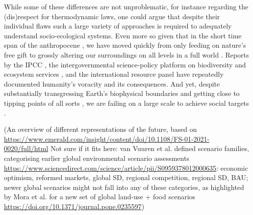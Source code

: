 \documentclass{article}
\begin{document}
\begin{refsection}
While some of these differences are not unproblematic, for instance regarding the (dis)respect for thermodynamic laws, one could argue that despite their individual flaws such a large variety of approaches is required to adequately understand socio-ecological systems. Even more so given that in the short time span of the anthropocene \parencite{crutzen_2006}, we have moved quickly from only feeding on nature's free gift \parencite{karsten_1987} to grossly altering our surroundings on all levels in a full world \parencite{daly_2005}. Reports by the IPCC \parencite[e.g.][]{ipcc_2022}, the intergovernmental science-policy platform on biodiversity and ecosystem services \parencite*[e.g. IPBES,][]{ipbes_2019}, and the international resource panel \parencite[e.g.][]{unep_2016} have repeatedly documented humanity's voracity and its consequences. And yet, despite substantially transgressing Earth's biophysical boundaries and getting close to tipping points of all sorts \parencite{ceballos_2015,steffen_2015, steffen_2018}, we are failing on a large scale to achieve social targets \parencite{fanning_2022}.

(An overview of different representations of the future, based on \url{https://www.emerald.com/insight/content/doi/10.1108/FS-01-2021-0020/full/html}
Not sure if it fits here: van Vuuren et al. defined scenario families, categorising earlier global environmental scenario assessments \url{https://www.sciencedirect.com/science/article/pii/S0959378012000635}: economic optimism, reformed markets, global SD, regional competition, regional SD, BAU; newer global scenarios might not fall into any of these categories, as highlighted by Mora et al. for a new set of global land-use + food scenarios \url{https://doi.org/10.1371/journal.pone.0235597})


\end{refsection}
\end{document}
